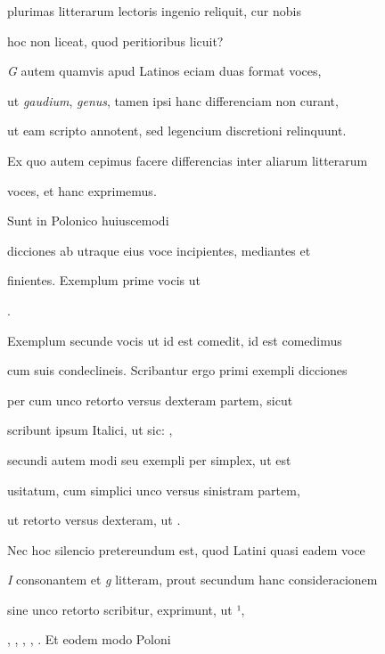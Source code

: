 plurimas  litterarum lectoris ingenio reliquit, cur nobis 

hoc non liceat, quod peritioribus licuit? 

\indentK \textit{G} autem quamvis apud Latinos eciam duas format voces, 

ut \textit{gaudium}, \textit{genus}, tamen ipsi hanc differenciam non curant, 

ut eam scripto annotent, sed legencium discretioni relinquunt. 

Ex quo autem cepimus facere differencias inter aliarum litterarum 

\splitlines

voces, et hanc exprimemus.

\indentK Sunt in Polonico huiuscemodi 

\fulllines

dicciones ab utraque eius voce incipientes, mediantes et

finientes. Exemplum prime vocis ut   

      .

Exemplum secunde vocis ut  id est comedit,  id est comedimus

cum suis condeclineis. Scribantur ergo primi exempli dicciones

per  cum unco retorto versus dexteram partem, sicut 

scribunt ipsum Italici, ut sic:   ,

secundi autem modi seu exempli per  simplex, ut est

usitatum, cum simplici unco versus sinistram partem,

ut retorto versus dexteram, ut   .

\indentK Nec hoc silencio pretereundum est, quod Latini quasi eadem voce

\textit{I} consonantem et \textit{g} litteram, prout secundum hanc consideracionem 

sine unco retorto scribitur, exprimunt, ut ¹,

, , , , . Et eodem modo Poloni

